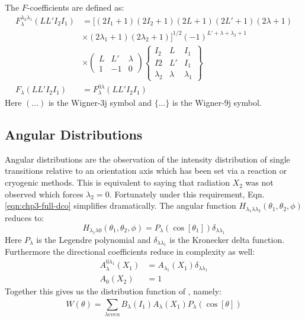 The $F$-coefficients are defined as:
\begin{align}
F_{\lambda{}}^{\lambda{}_2\lambda{}_1}(L L' I_2 I_1) &=[(2I_1+1)(2I_2+1)(2L+1)(2L'+1)(2\lambda{}+1)\nonumber \\ & \times{} (2\lambda{}_1+1)(2\lambda{}_2+1)]^{1/2} (-1)^{L'+\lambda{}+\lambda{}_2+1}\nonumber \\
& \times{} \left(\begin{array}{clcr}L & L' & \lambda{}\\ 1 & -1 & 0  \end{array}\right) \left\{\begin{array}{clcr}I_2 & L & I_1\\ I2 & L' & I_1\\ \lambda{}_2 & \lambda{} & \lambda{}_1 \end{array}\right\} \label{eqn:chp3-gen-fcoef}\\
F_{\lambda{}}(L L' I_2 I_1) &= F_{\lambda{}}^{0\lambda{}}(L L' I_2 I_1)\label{eqn:chp3-fcoef}
\end{align}
Here $(...)$ is the Wigner-3j symbol and $\{ ... \}$ is the Wigner-9j symbol.

\subsection{Angular Distributions}
\label{ssec:exp-pr-data-ang-dist}
Angular distributions are the observation of the intensity distribution of single transitions relative to an orientation axis which has been set via a reaction or cryogenic methods. This is equivalent to saying that radiation $X_2$ was not observed which forces $\lambda{}_2=0$. Fortunately under this requirement, Eqn. \ref{eqn:chp3-full-dco} simplifies dramatically. The angular function $H_{\lambda{}_1\lambda{}\lambda{}_2}\left(\theta{}_1,\theta{}_2,\phi{}\right)$ reduces to:
\begin{equation}
\label{eqn:chp3-simple-ang-func}
H_{\lambda{}_1\lambda{}0}\left(\theta{}_1,\theta{}_2,\phi{}\right) = P_{\lambda{}}(\cos[\theta{}_1])\delta_{\lambda{}\lambda{}_1}
\end{equation}
Here $P_{\lambda{}}$ is the Legendre polynomial and $\delta_{\lambda{}\lambda{}_1}$ is the Kronecker delta function. Furthermore the directional coefficients reduce in complexity as well:
\begin{align}
A_{\lambda{}}^{0\lambda{}_1}\left(X_1\right) &= A_{\lambda{}_1}\left(X_1\right)\delta_{\lambda{}\lambda{}_1} \label{eqn:chp3-gen-ddc-red}\\
A_{0}\left(X_2\right) &= 1 \label{eqn:chp3-ddc-red}
\end{align}
Together this gives us the distribution function of \cite{angDist}, namely:
\begin{equation}
\label{eqn:chp3-ang-dist}
W(\theta{}) = \sum\limits_{\lambda even}^{} B_{\lambda{}}\left(I_1\right) A_{\lambda{}}\left(X_1\right) P_{\lambda{}}(\cos[\theta{}])
\end{equation}

